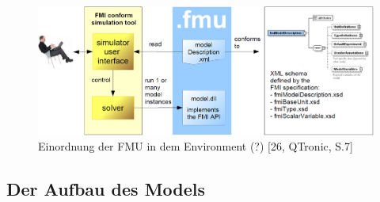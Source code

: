 \begin{figure}[h]
	\centering
	\includegraphics[width=1\linewidth]{Bilder/A22_User-FMU-FMI}
	\caption{Einordnung der FMU in dem Environment (?) [26, QTronic, S.7]}
	\label{fig:FMUEinordnung}
\end{figure}


\subsection{Der Aufbau des Models}\label{sec:ModelAufbau}
